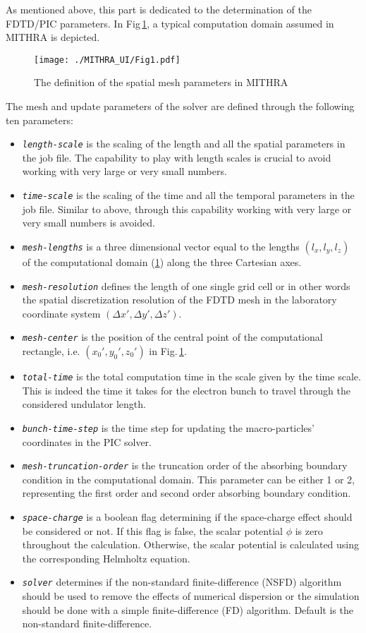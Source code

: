 As mentioned above, this part is dedicated to the determination of the FDTD/PIC parameters.
%
In Fig\,\ref{RefcardFig1}, a typical computation domain assumed in MITHRA is depicted.
%
\begin{figure}
\centering
\texttt{[image: ./MITHRA\_UI/Fig1.pdf]}
\caption{The definition of the spatial mesh parameters in MITHRA}
\label{RefcardFig1}
\end{figure}
%
The mesh and update parameters of the solver are defined through the following ten parameters:
%
\begin{itemize}
	\item {\tt \em \small length-scale} is the scaling of the length and all the spatial parameters in the job file. The capability to play with length scales is crucial to avoid working with very large or very small numbers.
	\item {\tt \em \small time-scale} is the scaling of the time and all the temporal parameters in the job file. Similar to above, through this capability working with very large or very small numbers is avoided.
	\item {\tt \em \small mesh-lengths} is a three dimensional vector equal to the lengths $(l_x,l_y,l_z)$ of the computational domain (\ref{RefcardFig1}) along the three Cartesian axes.
	\item {\tt \em \small mesh-resolution} defines the length of one single grid cell or in other words the spatial discretization resolution of the FDTD mesh in the laboratory coordinate system $(\Delta x',\Delta y',\Delta z')$.
	\item {\tt \em \small mesh-center} is the position of the central point of the computational rectangle, i.e. $(x_0',y_0',z_0')$ in Fig.\,\ref{RefcardFig1}.
	\item {\tt \em \small total-time} is the total computation time in the scale given by the time scale. This is indeed the time it takes for the electron bunch to travel through the considered undulator length.
	\item {\tt \em \small bunch-time-step} is the time step for updating the macro-particles' coordinates in the PIC solver.
	\item {\tt \em \small mesh-truncation-order} is the truncation order of the absorbing boundary condition in the computational domain. This parameter can be either 1 or 2, representing the first order and second order absorbing boundary condition.
	\item {\tt \em \small space-charge} is a boolean flag determining if the space-charge effect should be considered or not. If this flag is false, the scalar potential $\phi$ is zero throughout the calculation. Otherwise, the scalar potential is calculated using the corresponding Helmholtz equation.
	\item {\tt \em \small solver} determines if the non-standard finite-difference (NSFD) algorithm should be used to remove the effects of numerical dispersion or the simulation should be done with a simple finite-difference (FD) algorithm. Default is the non-standard finite-difference.
\end{itemize}

